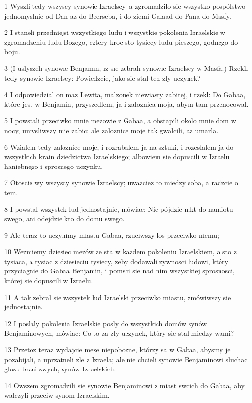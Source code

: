 \par 1 Wyszli tedy wszyscy synowie Izraelscy, a zgromadzilo sie wszystko pospólstwo jednomyslnie od Dan az do Beerseba, i do ziemi Galaad do Pana do Masfy.
\par 2 I staneli przedniejsi wszystkiego ludu i wszystkie pokolenia Izraelskie w zgromadzeniu ludu Bozego, cztery kroc sto tysiecy ludu pieszego, godnego do boju.
\par 3 (I uslyszeli synowie Benjamin, iz sie zebrali synowie Izraelscy w Masfa.) Rzekli tedy synowie Izraelscy: Powiedzcie, jako sie stal ten zly uczynek?
\par 4 I odpowiedzial on maz Lewita, malzonek niewiasty zabitej, i rzekl: Do Gabaa, które jest w Benjamin, przyszedlem, ja i zaloznica moja, abym tam przenocowal.
\par 5 I powstali przeciwko mnie mezowie z Gabaa, a obstapili okolo mnie dom w nocy, umysliwszy mie zabic; ale zaloznice moje tak gwalcili, az umarla.
\par 6 Wzialem tedy zaloznice moje, i rozrabalem ja na sztuki, i rozeslalem ja do wszystkich krain dziedzictwa Izraelskiego; albowiem sie dopuscili w Izraelu haniebnego i sprosnego uczynku.
\par 7 Otoscie wy wszyscy synowie Izraelscy; uwazciez to miedzy soba, a radzcie o tem.
\par 8 I powstal wszystek lud jednostajnie, mówiac: Nie pójdzie nikt do namiotu swego, ani odejdzie kto do domu swego.
\par 9 Ale teraz to uczynimy miastu Gabaa, rzuciwszy los przeciwko niemu;
\par 10 Wezmiemy dziesiec mezów ze sta w kazdem pokoleniu Izraelskiem, a sto z tysiaca, a tysiac z dziesieciu tysiecy, zeby dodawali zywnosci ludowi, który przyciagnie do Gabaa Benjamin, i pomsci sie nad nim wszystkiej sprosnosci, której sie dopuscili w Izraelu.
\par 11 A tak zebral sie wszystek lud Izraelski przeciwko miastu, zmówiwszy sie jednostajnie.
\par 12 I poslaly pokolenia Izraelskie posly do wszystkich domów synów Benjaminowych, mówiac: Co to za zly uczynek, który sie stal miedzy wami?
\par 13 Przetoz teraz wydajcie meze niepobozne, którzy sa w Gabaa, abysmy je pozabijali, a uprzatneli zle z Izraela; ale nie chcieli synowie Benjaminowi sluchac glosu braci swych, synów Izraelskich.
\par 14 Owszem zgromadzili sie synowie Benjaminowi z miast swoich do Gabaa, aby walczyli przeciw synom Izraelskim.
